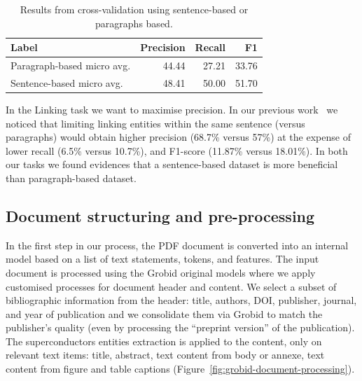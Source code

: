 \documentclass[]{interact}
\theoremstyle{plain}%
\theoremstyle{definition}
\theoremstyle{remark}
\begin{document}
\begin{table}[ht]
\centering\small
\begin{tabular}{lrrr}
\toprule
\textbf{Label} & \textbf{Precision} & \textbf{Recall} & \textbf{F1} \\
\midrule
Paragraph-based micro avg. & 44.44 & 27.21 & 33.76   \\
Sentence-based micro avg. & 48.41 & 50.00 & 51.70  \\
\bottomrule
\end{tabular}
\caption{\label{tab:comparison-evaluation-sentences-paragraphs} Results from cross-validation using sentence-based or paragraphs based.  }
\end{table}

In the Linking task we want to maximise precision. 
In our previous work~\cite{foppiano2019proposal} we noticed that limiting linking entities within the same sentence (versus paragraphs) would obtain higher precision (68.7\% versus 57\%) at the expense of lower recall (6.5\% versus 10.7\%), and F1-score (11.87\% versus 18.01\%). 
In both our tasks we found evidences that a sentence-based dataset is more beneficial than paragraph-based dataset. 


\subsection{Document structuring and pre-processing}
\label{subsubsec:document-structuring}
In the first step in our process, the PDF document is converted into an internal model based on a list of text statements, tokens, and features. 
The input document is processed using the Grobid original models where we apply customised processes for document header and content. 
We select a subset of bibliographic information from the header: title, authors, DOI, publisher, journal, and year of publication and we consolidate them via Grobid to match the publisher's quality (even by processing the ``preprint version'' of the publication). 
The superconductors entities extraction is applied to the content, only on relevant text items: title, abstract, text content from body or annexe, text content from figure and table captions (Figure~\ref{fig:grobid-document-processing}).
\end{document}
